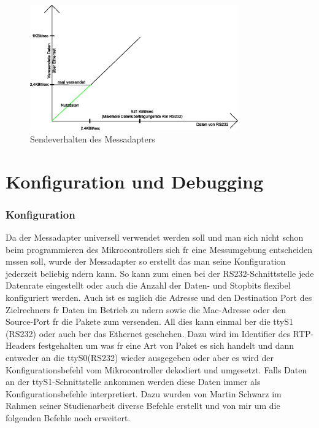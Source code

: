 \documentclass[a4paper]{book}%
\begin{document}
\begin{figure}[H]
	\centering
	\includegraphics[width=0.8\textwidth]{figures/sendeverhalten.eps}
	\caption[Sendeverhalten des Messadapters]{Sendeverhalten des Messadapters}
	\label{fig:sendedia}
\end{figure}


\newpage

\section{Konfiguration und Debugging}

\subsubsection{Konfiguration}

\label{chapter:konfig}

Da der Messadapter universell verwendet werden soll und man sich nicht schon beim programmieren des Mikrocontrollers sich fr eine Messumgebung entscheiden mssen soll, wurde der Messadapter so erstellt das man seine Konfiguration jederzeit beliebig ndern kann.
So kann zum einen bei der RS232-Schnittstelle jede Datenrate eingestellt oder auch die Anzahl der Daten- und Stopbits flexibel konfiguriert werden. Auch ist es mglich die Adresse und den Destination Port des Zielrechners fr Daten im Betrieb zu ndern sowie die Mac-Adresse oder den Source-Port fr die Pakete zum versenden. All dies kann einmal ber die ttyS1 (RS232) oder auch ber das Ethernet geschehen. Dazu wird im Identifier des RTP-Headers festgehalten um was fr eine Art von Paket es sich handelt und dann entweder an die ttyS0(RS232)  wieder ausgegeben oder aber es wird der Konfigurationsbefehl vom Mikrocontroller dekodiert und umgesetzt. Falls Daten an der ttyS1-Schnittstelle ankommen werden diese Daten immer als Konfigurationsbefehle interpretiert. Dazu wurden von Martin Schwarz im Rahmen seiner Studienarbeit diverse Befehle erstellt und von mir um die folgenden Befehle noch erweitert.
\end{document}
